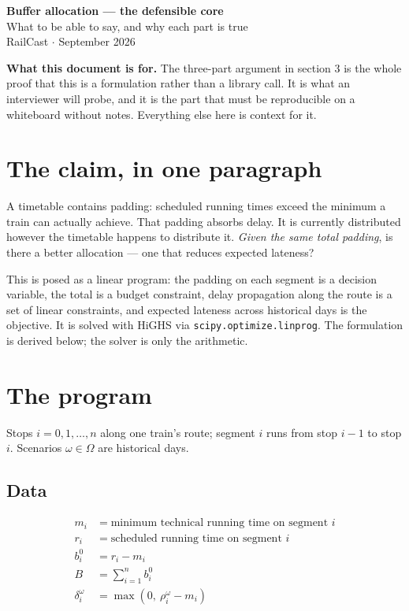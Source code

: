 \documentclass[11pt,a4paper]{article}
\newcommand{\code}[1]{\texttt{\small #1}}
\begin{document}
\begin{center}
{\LARGE\bfseries\color{accent} Buffer allocation --- the defensible core}\\[0.4em]
{\large What to be able to say, and why each part is true}\\[0.8em]
{\small RailCast \quad$\cdot$ September 2026}
\end{center}

\vspace{0.3em}
\begin{keybox}
\textbf{What this document is for.} The three-part argument in section 3 is the whole proof
that this is a formulation rather than a library call. It is what an interviewer will probe,
and it is the part that must be reproducible on a whiteboard without notes. Everything else
here is context for it.
\end{keybox}

\section{The claim, in one paragraph}

A timetable contains padding: scheduled running times exceed the minimum a train can
actually achieve. That padding absorbs delay. It is currently distributed however the
timetable happens to distribute it. \emph{Given the same total padding}, is there a better
allocation --- one that reduces expected lateness?

This is posed as a linear program: the padding on each segment is a decision variable,
the total is a budget constraint, delay propagation along the route is a set of linear
constraints, and expected lateness across historical days is the objective. It is solved
with HiGHS via \code{scipy.optimize.linprog}. The formulation is derived below; the solver
is only the arithmetic.

\section{The program}

Stops $i = 0,1,\dots,n$ along one train's route; segment $i$ runs from stop $i-1$ to stop
$i$. Scenarios $\omega \in \Omega$ are historical days.

\subsection*{Data}

\[
\begin{aligned}
m_i &= \text{minimum technical running time on segment } i \\
r_i &= \text{scheduled running time on segment } i \\
b_i^0 &= r_i - m_i \\
B &= \textstyle\sum_{i=1}^{n} b_i^0 \\
\delta_i^\omega &= \max\!\left(0,\ \rho_i^\omega - m_i\right)
\end{aligned}
\]
\end{document}
